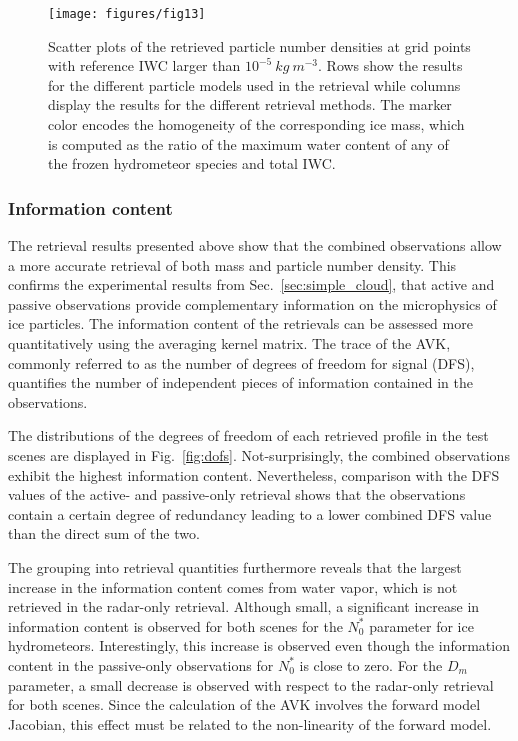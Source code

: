\documentclass[journal abbreviation, manuscript]{copernicus}
\begin{document}
\begin{figure}
\centering
\texttt{[image: figures/fig13]}
\caption{Scatter plots of the retrieved particle number densities at grid points
  with reference IWC larger than $10^{-5}\ \unit{kg\ m^{-3}}$. Rows show
  the results for the different particle models used in the retrieval while
  columns display the results for the different retrieval methods. The marker
  color encodes the homogeneity of the corresponding ice mass, which is computed
  as the ratio of the maximum water content of any of the frozen hydrometeor
  species and total IWC.}
\label{fig:results_nd_scatter_a}
\end{figure}

\subsubsection{Information content}

The retrieval results presented above show that the combined observations allow
a more accurate retrieval of both mass and particle number density. This
confirms the experimental results from Sec.~\ref{sec:simple_cloud}, that active
and passive observations provide complementary information on the microphysics
of ice particles. The information content of the retrievals can be assessed more
quantitatively using the averaging kernel matrix. The trace of the AVK, commonly
referred to as the number of degrees of freedom for signal (DFS), quantifies the
number of independent pieces of information contained in the observations.

The distributions of the degrees of freedom of each retrieved profile in the
test scenes are displayed in Fig.~\ref{fig:dofs}. Not-surprisingly, the combined
observations exhibit the highest information content. Nevertheless, comparison
with the DFS values of the active- and passive-only retrieval shows that the
observations contain a certain degree of redundancy leading to a lower combined
DFS value than the direct sum of the two.

The grouping into retrieval quantities furthermore reveals that the largest
increase in the information content comes from water vapor, which is not
retrieved in the radar-only retrieval. Although small, a significant increase in
information content is observed for both scenes for the $N_0^*$ parameter for
ice hydrometeors. Interestingly, this increase is observed even though the
information content in the passive-only observations for $N_0^*$ is close to
zero. For the $D_m$ parameter, a small decrease is observed with respect to the
radar-only retrieval for both scenes. Since the calculation of the AVK involves
the forward model Jacobian, this effect must be related to the non-linearity of
the forward model.
\end{document}
